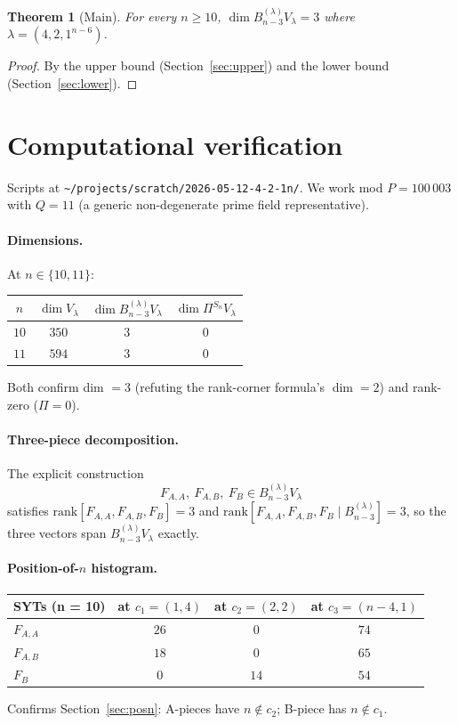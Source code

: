 \documentclass[11pt]{article}
\newtheorem{theorem}{Theorem}
\theoremstyle{definition}
\begin{document}
\begin{theorem}[Main]\label{thm:main}
For every $n \ge 10$,
$\dim B_{n-3}^{(\lambda)} V_\lambda = 3$ where $\lambda =
(4, 2, 1^{n-6})$.
\end{theorem}

\begin{proof}
By the upper bound (Section~\ref{sec:upper}) and the lower bound
(Section~\ref{sec:lower}).
\end{proof}

\section{Computational verification}\label{sec:verify}

Scripts at \texttt{\textasciitilde/projects/scratch/2026-05-12-4-2-1n/}.
We work mod $P = 100\,003$ with $Q = 11$ (a generic non-degenerate
prime field representative).

\paragraph{Dimensions.} At $n \in \{10, 11\}$:
\begin{center}
\begin{tabular}{cccc}
\toprule
$n$ & $\dim V_\lambda$ & $\dim B_{n-3}^{(\lambda)} V_\lambda$ &
$\dim \Pi^{S_n} V_\lambda$\\
\midrule
$10$ & $350$ & $3$ & $0$\\
$11$ & $594$ & $3$ & $0$\\
\bottomrule
\end{tabular}
\end{center}
Both confirm dim $= 3$ (refuting the rank-corner formula's
$\dim = 2$) and rank-zero ($\Pi = 0$).

\paragraph{Three-piece decomposition.} The explicit construction
\[
   F_{A,A},\ F_{A,B},\ F_B \in B_{n-3}^{(\lambda)} V_\lambda
\]
satisfies $\mathrm{rank}[F_{A,A}, F_{A,B}, F_B] = 3$ and
$\mathrm{rank}[F_{A,A}, F_{A,B}, F_B \mid B_{n-3}^{(\lambda)}] = 3$,
so the three vectors span $B_{n-3}^{(\lambda)} V_\lambda$ exactly.

\paragraph{Position-of-$n$ histogram.}
\begin{center}
\begin{tabular}{lccc}
\toprule
SYTs (n = 10) & at $c_1 = (1, 4)$ & at $c_2 = (2, 2)$ & at $c_3 = (n-4, 1)$\\
\midrule
$F_{A,A}$ & $26$ & $0$ & $74$\\
$F_{A,B}$ & $18$ & $0$ & $65$\\
$F_B$     & $0$  & $14$ & $54$\\
\bottomrule
\end{tabular}
\end{center}
Confirms Section~\ref{sec:posn}: A-pieces have $n \notin c_2$;
B-piece has $n \notin c_1$.
\end{document}
